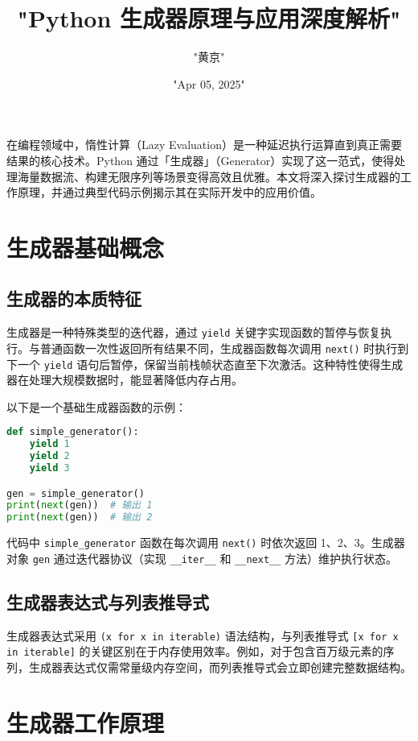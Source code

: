 \title{"Python 生成器原理与应用深度解析"}
\author{"黄京"}
\date{"Apr 05, 2025"}
\maketitle
在编程领域中，惰性计算（Lazy Evaluation）是一种延迟执行运算直到真正需要结果的核心技术。Python 通过「生成器」（Generator）实现了这一范式，使得处理海量数据流、构建无限序列等场景变得高效且优雅。本文将深入探讨生成器的工作原理，并通过典型代码示例揭示其在实际开发中的应用价值。\par
\chapter{生成器基础概念}
\section{生成器的本质特征}
生成器是一种特殊类型的迭代器，通过 \verb!yield! 关键字实现函数的暂停与恢复执行。与普通函数一次性返回所有结果不同，生成器函数每次调用 \verb!next()! 时执行到下一个 \verb!yield! 语句后暂停，保留当前栈帧状态直至下次激活。这种特性使得生成器在处理大规模数据时，能显著降低内存占用。\par
以下是一个基础生成器函数的示例：\par
\begin{lstlisting}[language=python]
def simple_generator():
    yield 1
    yield 2
    yield 3

gen = simple_generator()
print(next(gen))  # 输出 1
print(next(gen))  # 输出 2
\end{lstlisting}
代码中 \verb!simple_generator! 函数在每次调用 \verb!next()! 时依次返回 1、2、3。生成器对象 \verb!gen! 通过迭代器协议（实现 \verb!__iter__! 和 \verb!__next__! 方法）维护执行状态。\par
\section{生成器表达式与列表推导式}
生成器表达式采用 \verb!(x for x in iterable)! 语法结构，与列表推导式 \verb![x for x in iterable]! 的关键区别在于内存使用效率。例如，对于包含百万级元素的序列，生成器表达式仅需常量级内存空间，而列表推导式会立即创建完整数据结构。\par
\chapter{生成器工作原理}

